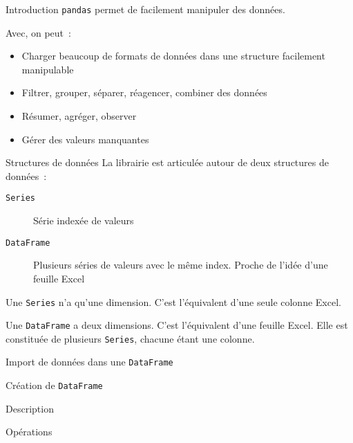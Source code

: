 \begin{frame}{Introduction}
  \texttt{pandas} permet de facilement manipuler des données.

  Avec, on peut~:

  \begin{itemize}
    \item Charger beaucoup de formats de données dans une structure facilement manipulable
    \item Filtrer, grouper, séparer, réagencer, combiner des données
    \item Résumer, agréger, observer
    \item Gérer des valeurs manquantes
  \end{itemize}
\end{frame}

\begin{frame}{Structures de données}
  La librairie est articulée autour de deux structures de données~:

  \begin{description}
    \item[\texttt{Series}] Série indexée de valeurs
    \item[\texttt{DataFrame}] Plusieurs séries de valeurs avec le même index. Proche de l'idée d'une feuille Excel
  \end{description}

  Une \texttt{Series} n'a qu'une dimension. C'est l'équivalent d'une seule colonne Excel.

  Une \texttt{DataFrame} a deux dimensions. C'est l'équivalent d'une feuille Excel. Elle est constituée de plusieurs \texttt{Series}, chacune étant une colonne.
\end{frame}

\begin{frame}{Import de données dans une \texttt{DataFrame}}
  
\end{frame}

\begin{frame}{Création de \texttt{DataFrame}}
  
\end{frame}

\begin{frame}{Description}
  
\end{frame}

\begin{frame}{Opérations}
  
\end{frame}

